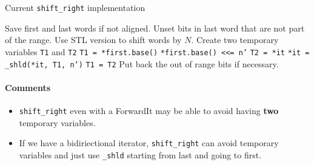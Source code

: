 \documentclass[letterpaper, 8pt, twocolumn]{article}
\begin{document}
\begin{algorithm}[H]
    \caption{Current \texttt{shift\_right} implementation}
    \begin{algorithmic}[1]
            \State Save first and last words if not aligned.
            \State Unset bits in last word that are not part of 
            the range.
            \State Use STL version to shift words by $N$.
            \State Create two temporary variables \texttt{T1} and \texttt{T2}
            \State \texttt{T1 = *first.base()}
            \State \texttt{*first.base() <<= n'}
                \State \texttt{T2 = *it}
                \State \texttt{*it = \_shld(*it, T1, n')}
                \State \texttt{T1 = T2}
            \EndFor
            \State Put back the out of range bits if necessary.
        \EndFunction
    \end{algorithmic}
\end{algorithm}

\paragraph{Comments}
\begin{itemize}
    \item \texttt{shift\_right} even with a ForwardIt may be able to avoid
        having \textbf{two} temporary variables.
    \item If we have a bidiriectional iterator, \texttt{shift\_right} 
        can avoid temporary variables and just use \texttt{\_shld} starting 
        from last and going to first.
\end{itemize}

\end{document}
